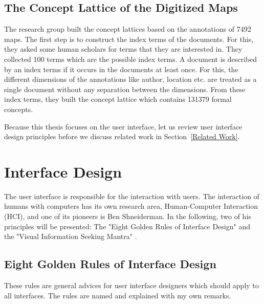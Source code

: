 \documentclass[11pt]{report}
\begin{document}
\subsection{The Concept Lattice of the Digitized Maps}
\label{thedata}

The research group built the concept lattices based on the annotations of 7492 maps. The first step is to construct the index terms of the documents. For this, they asked some human scholars for terms that they are interested in. They collected 100 terms which are the possible index terms. A document is described by an index terms if it occurs in the documents at least once. For this, the different dimensions of the annotations like author, location etc. are treated as a single document without any separation between the dimensions. From these index terms, they built the concept lattice which contains 131379 formal concepts. 

Because this thesis focuses on the user interface, let us review user interface design principles before we discuss related work in Section~\ref{Related Work}.

\section{Interface Design}
\label{id}

The user interface is responsible for the interaction with users. The interaction of humans with computers has its own research area, Human-Computer Interaction (HCI), and one of its pioneers is Ben Shneiderman. In the following, two of his principles will be presented: The "Eight Golden Rules of Interface Design" \cite{Shneiderman2010} and the "Visual Information Seeking Mantra" \cite{Shneiderman1996}.

\subsection{Eight Golden Rules of Interface Design}
\label{Golden}

These rules \cite{Shneiderman2010} are general advices for user interface designers which should apply to all interfaces. The rules are named and explained with my own remarks. \\
\end{document}
